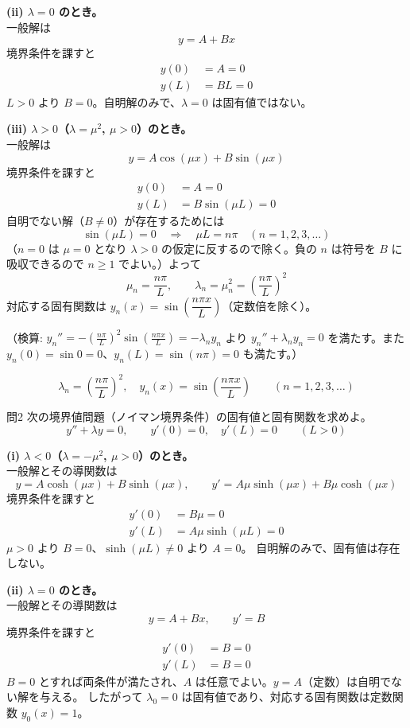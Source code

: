 \documentclass[a4paper,11pt]{article}
\begin{document}
\textbf{(ii) $\lambda = 0$ のとき。}\\
一般解は
\[
y = A + Bx
\]
境界条件を課すと
\begin{align*}
y(0) &= A = 0 \\
y(L) &= BL = 0
\end{align*}
$L > 0$ より $B = 0$。自明解のみで、$\lambda = 0$ は固有値ではない。

\textbf{(iii) $\lambda > 0$（$\lambda = \mu^{2}$, $\mu>0$）のとき。}\\
一般解は
\[
y = A\cos(\mu x) + B\sin(\mu x)
\]
境界条件を課すと
\begin{align*}
y(0) &= A = 0 \\
y(L) &= B\sin(\mu L) = 0
\end{align*}
自明でない解（$B \neq 0$）が存在するためには
\[
\sin(\mu L) = 0 \quad\Longrightarrow\quad \mu L = n\pi \quad (n = 1, 2, 3, \dots)
\]
（$n=0$ は $\mu=0$ となり $\lambda>0$ の仮定に反するので除く。負の $n$ は符号を $B$ に吸収できるので $n \ge 1$ でよい。）よって
\[
\mu_{n} = \frac{n\pi}{L}, \qquad \lambda_{n} = \mu_{n}^{2} = \left(\frac{n\pi}{L}\right)^{2}
\]
対応する固有関数は $y_{n}(x) = \sin\!\left(\dfrac{n\pi x}{L}\right)$（定数倍を除く）。

（検算: $y_n'' = -\left(\frac{n\pi}{L}\right)^2 \sin\left(\frac{n\pi x}{L}\right) = -\lambda_n y_n$ より $y_n'' + \lambda_n y_n = 0$ を満たす。また $y_n(0) = \sin 0 = 0$、$y_n(L) = \sin(n\pi) = 0$ も満たす。）

\[
\boxed{\; \lambda_{n} = \left(\frac{n\pi}{L}\right)^{2}, \quad y_{n}(x) = \sin\!\left(\frac{n\pi x}{L}\right) \qquad (n = 1, 2, 3, \dots) \;}
\]

\clearpage
\begin{mondaiboxS}{問2}
次の境界値問題（ノイマン境界条件）の固有値と固有関数を求めよ。
\[
y'' + \lambda y = 0, \qquad y'(0) = 0, \quad y'(L) = 0 \qquad (L > 0)
\]
\end{mondaiboxS}
\kaitou

\textbf{(i) $\lambda < 0$（$\lambda = -\mu^{2}$, $\mu>0$）のとき。}\\
一般解とその導関数は
\[
y = A\cosh(\mu x) + B\sinh(\mu x), \qquad
y' = A\mu\sinh(\mu x) + B\mu\cosh(\mu x)
\]
境界条件を課すと
\begin{align*}
y'(0) &= B\mu = 0 \\
y'(L) &= A\mu\sinh(\mu L) = 0
\end{align*}
$\mu > 0$ より $B = 0$、$\sinh(\mu L)\neq 0$ より $A=0$。
自明解のみで、固有値は存在しない。

\textbf{(ii) $\lambda = 0$ のとき。}\\
一般解とその導関数は
\[
y = A + Bx, \qquad y' = B
\]
境界条件を課すと
\begin{align*}
y'(0) &= B = 0 \\
y'(L) &= B = 0
\end{align*}
$B = 0$ とすれば両条件が満たされ、$A$ は任意でよい。$y = A$（定数）は自明でない解を与える。
したがって $\lambda_{0} = 0$ は固有値であり、対応する固有関数は定数関数 $y_{0}(x) = 1$。
\end{document}
